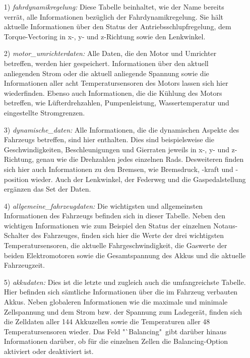 \documentclass[fontsize = 12pt, paper = a4]{scrreprt}
\begin{document}
\begin{itemize}

\item[1)] \textit{fahrdynamikregelung:} 
Diese Tabelle beinhaltet, wie der Name bereits verrät, alle Informationen bezüglich der Fahrdynamikregelung. Sie hält aktuelle Informationen über den Status der Antriebsschlupfregelung, dem Torque-Vectoring in x-, y- und z-Richtung sowie den Lenkwinkel.

\item[2)] \textit{motor\_umrichterdaten:}
Alle Daten, die den Motor und Umrichter betreffen, werden hier gespeichert. Informationen über den aktuell anliegenden Strom oder die aktuell anliegende Spannung sowie die Informationen aller acht Temperatursensoren des Motors lassen sich hier wiederfinden. Ebenso auch Informationen, die die Kühlung des Motors betreffen, wie Lüfterdrehzahlen, Pumpenleistung, Wassertemperatur und eingestellte Stromgrenzen.

\item[3)] \textit{dynamische\_daten:}
Alle Informationen, die die dynamischen Aspekte des Fahrzeugs betreffen, sind hier enthalten. Dies sind beispielsweise die Geschwindigkeiten, Beschleunigungen und Gierraten jeweils in x-, y- und z-Richtung, genau wie die Drehzahlen jedes einzelnen Rads. Desweiteren finden sich hier auch Informationen zu den Bremsen, wie Bremsdruck, -kraft und -position wieder. Auch der Lenkwinkel, der Federweg und die Gaspedalstellung ergänzen das Set der Daten.

\item[4)] \textit{allgemeine\_fahrzeugdaten:} 
Die wichtigsten und allgemeinsten Informationen des Fahrzeugs befinden sich in dieser Tabelle. Neben den wichtigen Informationen wie zum Beispiel den Status der einzelnen Notaus-Schalter des Fahrzeuges, finden sich hier die Werte der drei wichtigsten Temperatursensoren, die aktuelle Fahrgeschwindigkeit, die Gaswerte der beiden Elektromotoren sowie die Gesamtspannung des Akkus und die aktuelle Fahrzeugzeit.

\item[5)] \textit{akkudaten:} Dies ist die letzte und zugleich auch die umfangreichste Tabelle. Hier befinden sich sämtliche Informationen über die im Fahrzeug verbauten Akkus. Neben globaleren Informationen wie die maximale und minimale Zellspannung und dem Strom bzw. der Spannung zum Ladegerät, finden sich die Zelldaten aller 144 Akkuzellen sowie die Temperaturen aller 48 Temperatursensoren wieder. Das Feld "`Balancing"\ gibt darüber hinaus Informationen darüber, ob für die einzelnen Zellen die Balancing-Option aktiviert oder deaktiviert ist.

\end{itemize}
\end{document}
